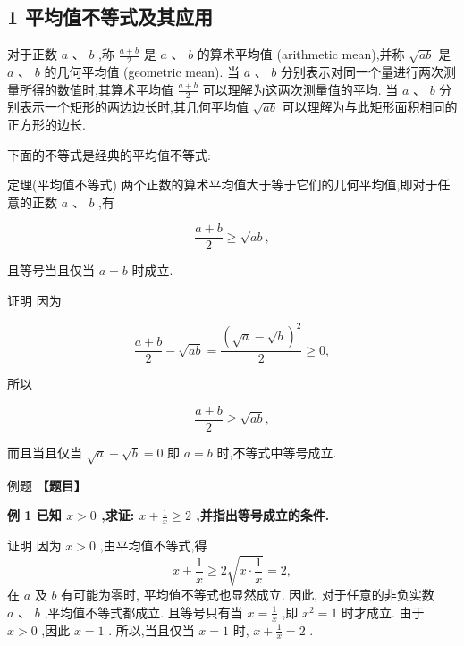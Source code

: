 \documentclass[a4paper,10pt,oneside,fontset=none]{ctexbook}
\renewcommand{\geq}{\geqslant}
\newcounter{example}[chapter]
\newenvironment{example}[1][]{\begin{exBox}{例题}{#1}}{\end{exBox}}
\numberwithin{equation}{chapter}
\begin{document}
\subsection{1 平均值不等式及其应用}

对于正数 $a\text{ 、 }b$ ,称 $\frac{a + b}{2}$ 是 $a\text{ 、 }b$ 的算术平均值 (arithmetic mean),并称 $\sqrt{ab}$ 是 $a\text{ 、 }b$ 的几何平均值 (geometric mean). 当 $a\text{ 、 }b$ 分别表示对同一个量进行两次测量所得的数值时,其算术平均值 $\frac{a + b}{2}$ 可以理解为这两次测量值的平均. 当 $a\text{ 、 }b$ 分别表示一个矩形的两边边长时,其几何平均值 $\sqrt{ab}$ 可以理解为与此矩形面积相同的正方形的边长.

下面的不等式是经典的平均值不等式:

定理(平均值不等式) 两个正数的算术平均值大于等于它们的几何平均值,即对于任意的正数 $a\text{ 、 }b$ ,有

$$
\frac{a + b}{2} \geq  \sqrt{ab},
$$

且等号当且仅当 $a = b$ 时成立.

证明 因为

$$
\frac{a + b}{2} - \sqrt{ab} = \frac{{\left( \sqrt{a} - \sqrt{b}\right) }^{2}}{2} \geq  0,
$$

所以

$$
\frac{a + b}{2} \geq  \sqrt{ab},
$$

而且当且仅当 $\sqrt{a} - \sqrt{b} = 0$ 即 $a = b$ 时,不等式中等号成立.

\begin{example}
\textbf{【题目】}\par\vspace{0.3em}
\textbf{例 1 已知 $x > 0$ ,求证: $x + \frac{1}{x} \geq  2$ ,并指出等号成立的条件.}\par\vspace{0.3em}
证明 因为 $x > 0$ ,由平均值不等式,得
$$
x + \frac{1}{x} \geq  2\sqrt{x \cdot  \frac{1}{x}} = 2,
$$
在 $a$ 及 $b$ 有可能为零时, 平均值不等式也显然成立. 因此, 对于任意的非负实数 $a\text{ 、 }b$ ,平均值不等式都成立.
且等号只有当 $x = \frac{1}{x}$ ,即 ${x}^{2} = 1$ 时才成立. 由于 $x > 0$ ,因此 $x = 1$ .
所以,当且仅当 $x = 1$ 时, $x + \frac{1}{x} = 2$ .
\end{example}
\end{document}
